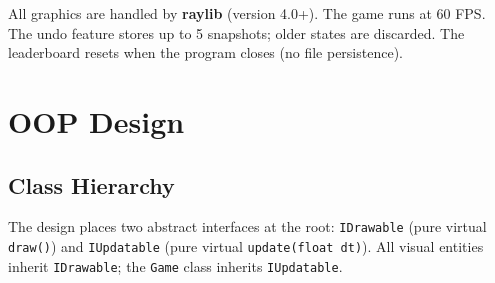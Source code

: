 \documentclass[11pt]{article}
\begin{document}
\begin{notebox}
All graphics are handled by \textbf{raylib} (version 4.0+). The game runs at 60 FPS.
The undo feature stores up to 5 snapshots; older states are discarded.
The leaderboard resets when the program closes (no file persistence).
\end{notebox}

\section{OOP Design}

\subsection{Class Hierarchy}

The design places two abstract interfaces at the root:
\texttt{IDrawable} (pure virtual \texttt{draw()}) and
\texttt{IUpdatable} (pure virtual \texttt{update(float dt)}).
All visual entities inherit \texttt{IDrawable}; the \texttt{Game} class inherits \texttt{IUpdatable}.
\end{document}
